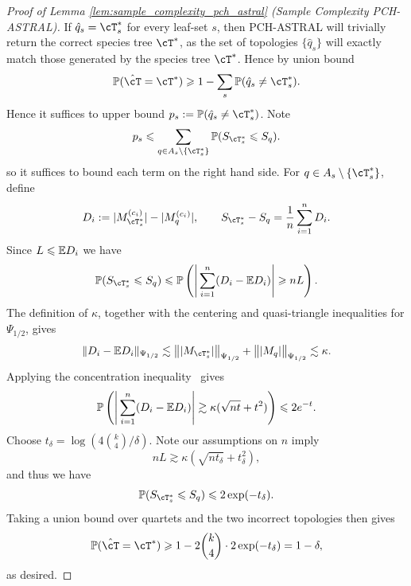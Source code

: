 \begin{proof}[Proof of Lemma \ref{lem:sample_complexity_pch_astral} (Sample Complexity PCH-ASTRAL)]
    If $\hat{q}_s = \cT_s^*$ for every leaf-set $s$, then PCH-ASTRAL will trivially return the correct species tree
    $\cT^*$, as the set of topologies $\{\hat{q}_s\}$ will exactly match those generated by the species tree $\cT^*$.
    Hence by union bound
     \[\P(\hat{\cT} = \cT^*) \geq 1 - \sum_{s} \P(\hat{q}_s \neq \cT_s^*).\]
    \noindent Hence it suffices to upper bound $p_s := \P(\hat{q}_s \neq \cT_s^*)$. Note
    \[p_s \leq \sum_{q \in A_s \setminus \{\cT_s^*\}} \P(S_{\cT_s^*} \leq S_q).\]
    \noindent so it suffices to bound each term on the right hand side. For $q \in A_s \setminus \{\cT_s^*\}$, define
        \[D_i := |M^{(c_i)}_{\cT_s^*}| - |M^{(c_i)}_q|, \qquad S_{\cT_s^*} - S_q = \frac{1}{n} \sum_{i=1}^n D_i.\]
    \noindent Since $L \leqslant \mathbb{E} D_i$ we have
        \[\P(S_{\cT_s^*} \leq S_q) \leq \P\left(\Bigg| \sum_{i=1}^n (D_i - \E D_i)\Bigg| \geq n L\right).\]
    \noindent The definition of $\kappa$, together with the centering and quasi-triangle
    inequalities for $\Psi_{1/2}$, gives
        \[\|D_i - \E D_i\|_{\Psi_{1/2}} \lesssim
        \bigl\||M_{\cT_s^*}|\bigr\|_{\Psi_{1/2}}
        + \bigl\||M_q|\bigr\|_{\Psi_{1/2}} \lesssim \kappa.\]
    \noindent Applying the concentration inequality~\cite[Theorem 3.1]{kuchibhotla2022_beyond_sub_gaussian_high_dimensional_statistics} gives
        \[\mathbb{P}\left(\Bigg| \sum_{i=1}^n (D_i - \mathbb{E} D_i)\Bigg| \gtrsim \kappa( \sqrt{nt} + t^2)\right) \leqslant 2e^{-t}.\]
    \noindent Choose $t_\delta = \log(4{k \choose 4} / \delta)$. Note our assumptions on $n$ imply
    \[nL \gtrsim \kappa (\sqrt{nt_\delta} + t_\delta^2),\]
    \noindent and thus we have
        \[\P(S_{\cT_s^*} \leq S_q) \leq 2\exp(-t_\delta).\]
    \noindent Taking a union bound over quartets and the two incorrect topologies then gives
        \[\P(\hat{\cT} = \cT^*) \geq 1 - 2{k \choose 4} \cdot 2\exp(-t_\delta) = 1-\delta,\]
    \noindent as desired.
\end{proof}

